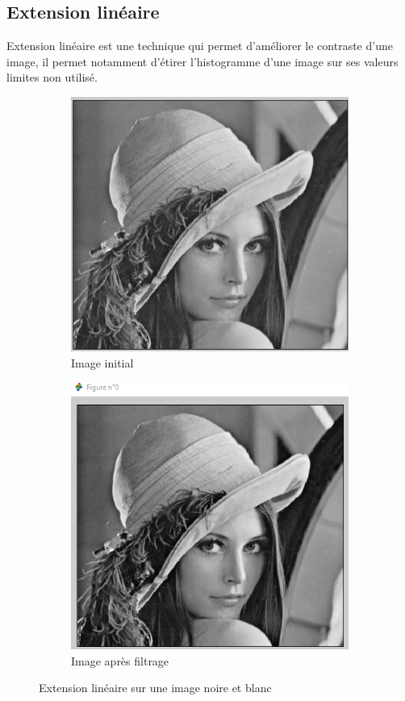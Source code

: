 \documentclass[12pt, letterpaper]{article}
\begin{document}
\subsection{Extension linéaire}
Extension linéaire est une technique qui permet d'améliorer le contraste d'une image, il permet notamment d'étirer 
l'histogramme d'une image sur ses valeurs limites non utilisé.

\begin{figure}[h!]
    \centering
    \begin{subfigure}[b]{0.7\linewidth}
      \includegraphics[width=\linewidth]{img/fig11.PNG}
      \caption{Image initial}
    \end{subfigure}
    \begin{subfigure}[b]{0.7\linewidth}
      \includegraphics[width=\linewidth]{img/fig12.PNG}
      \caption{Image après filtrage}
    \end{subfigure}
    \caption{Extension linéaire sur une image noire et blanc}
    \label{fig:extend1}
\end{figure}
\end{document}

